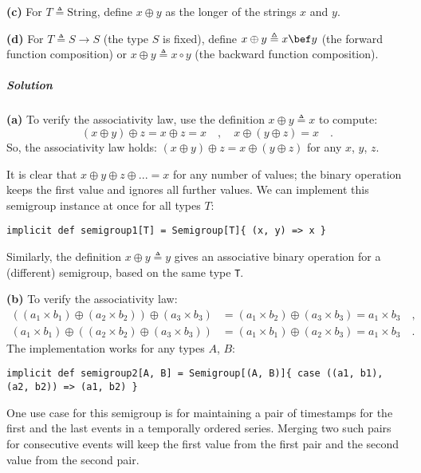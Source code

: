 \textbf{(c)} For $T\triangleq\text{String}$, define $x\oplus y$
as the longer of the strings $x$ and $y$.

\textbf{(d)} For $T\triangleq S\rightarrow S$ (the type $S$ is fixed),
define $x\oplus y\triangleq x\bef y$ (the forward function composition)
or $x\oplus y\triangleq x\circ y$ (the backward function composition).

\subparagraph{Solution}

\textbf{(a)} To verify the associativity law, use the definition $x\oplus y\triangleq x$
to compute:
\[
\left(x\oplus y\right)\oplus z=x\oplus z=x\quad,\quad x\oplus\left(y\oplus z\right)=x\quad.
\]
So, the associativity law holds: $\left(x\oplus y\right)\oplus z=x\oplus\left(y\oplus z\right)$
for any $x$, $y$, $z$.

It is clear that $x\oplus y\oplus z\oplus...=x$ for any number of
values; the binary operation keeps the first value and ignores all
further values. We can implement this semigroup instance at once for
all types $T$:
\begin{lstlisting}
implicit def semigroup1[T] = Semigroup[T]{ (x, y) => x }
\end{lstlisting}
Similarly, the definition $x\oplus y\triangleq y$ gives an associative
binary operation for a (different) semigroup, based on the same type
\lstinline!T!.

\textbf{(b)} To verify the associativity law:
\begin{align*}
\left(\left(a_{1}\times b_{1}\right)\oplus\left(a_{2}\times b_{2}\right)\right)\oplus\left(a_{3}\times b_{3}\right) & =\left(a_{1}\times b_{2}\right)\oplus\left(a_{3}\times b_{3}\right)=a_{1}\times b_{3}\quad,\\
\left(a_{1}\times b_{1}\right)\oplus\left(\left(a_{2}\times b_{2}\right)\oplus\left(a_{3}\times b_{3}\right)\right) & =\left(a_{1}\times b_{1}\right)\oplus\left(a_{2}\times b_{3}\right)=a_{1}\times b_{3}\quad.
\end{align*}
The implementation works for any types $A$, $B$:
\begin{lstlisting}
implicit def semigroup2[A, B] = Semigroup[(A, B)]{ case ((a1, b1), (a2, b2)) => (a1, b2) }
\end{lstlisting}

One use case for this semigroup is for maintaining a pair of timestamps
for the first and the last events in a temporally ordered series.
Merging two such pairs for consecutive events will keep the first
value from the first pair and the second value from the second pair.

